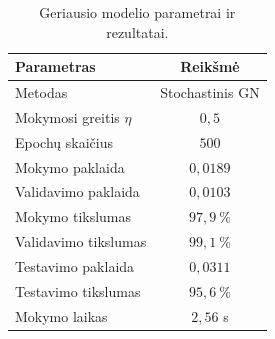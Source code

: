 \begin{table}[H]
    \centering
    \caption{Geriausio modelio parametrai ir rezultatai.}
    \begin{tabular}{|l|c|}
        \hline
        Parametras & Reikšmė \\
        \hline
        Metodas & Stochastinis GN \\ \hline
        Mokymosi greitis $\eta$ & $0{,}5$ \\ \hline
        Epochų skaičius & $500$ \\ \hline
        Mokymo paklaida & $0{,}0189$ \\ \hline
        Validavimo paklaida & $0{,}0103$ \\ \hline
        Mokymo tikslumas & $97{,}9\ \%$ \\ \hline
        Validavimo tikslumas & $99{,}1\ \%$ \\ \hline
        Testavimo paklaida & $0{,}0311$ \\ \hline
        Testavimo tikslumas & $95{,}6\ \%$ \\ \hline
        Mokymo laikas & $2{,}56$ s \\ \hline
    \end{tabular}
    \label{tab:best_model_results}
\end{table}